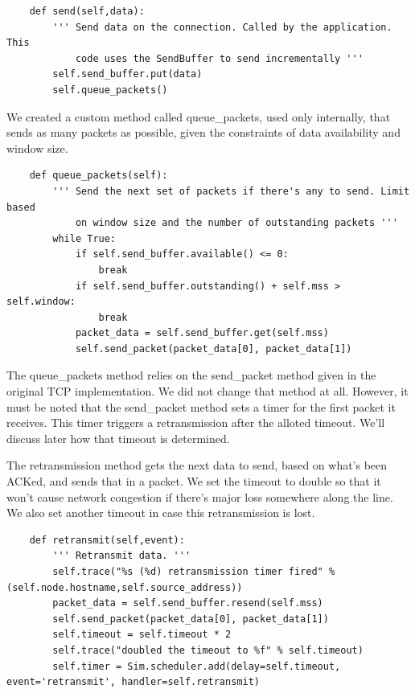 \documentclass[11pt]{article}
\begin{document}
\begin{lstlisting}
    def send(self,data):
        ''' Send data on the connection. Called by the application. This
            code uses the SendBuffer to send incrementally '''
        self.send_buffer.put(data)
        self.queue_packets()
\end{lstlisting}

\vspace{5mm}

We created a custom method called queue_packets, used only internally, that sends as many packets as possible, given the constraints of data availability and window size.

\vspace{5mm}

\begin{lstlisting}
    def queue_packets(self):
        ''' Send the next set of packets if there's any to send. Limit based
            on window size and the number of outstanding packets '''
        while True:
            if self.send_buffer.available() <= 0:
                break
            if self.send_buffer.outstanding() + self.mss > self.window:
                break
            packet_data = self.send_buffer.get(self.mss)
            self.send_packet(packet_data[0], packet_data[1])
\end{lstlisting}

\vspace{5mm}

The queue_packets method relies on the send_packet method given in the original TCP implementation. We did not change that method at all. However, it must be noted that the send_packet method sets a timer for the first packet it receives. This timer triggers a retransmission after the alloted timeout. We'll discuss later how that timeout is determined.

\vspace{5mm}

The retransmission method gets the next data to send, based on what's been ACKed, and sends that in a packet. We set the timeout to double so that it won't cause network congestion if there's major loss somewhere along the line. We also set another timeout in case this retransmission is lost.

\vspace{5mm}

\begin{lstlisting}
    def retransmit(self,event):
        ''' Retransmit data. '''
        self.trace("%s (%d) retransmission timer fired" % (self.node.hostname,self.source_address))
        packet_data = self.send_buffer.resend(self.mss)
        self.send_packet(packet_data[0], packet_data[1])
        self.timeout = self.timeout * 2
        self.trace("doubled the timeout to %f" % self.timeout)
        self.timer = Sim.scheduler.add(delay=self.timeout, event='retransmit', handler=self.retransmit)
\end{lstlisting}
\end{document}
